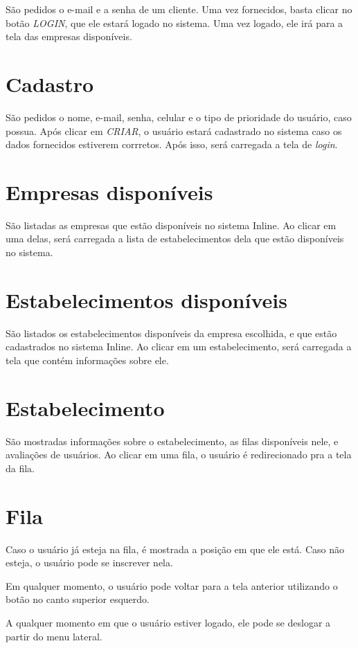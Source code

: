 \documentclass{book}
\begin{document}
São pedidos o e-mail e a senha de um cliente. Uma vez fornecidos, basta clicar
no botão \textit{LOGIN}, que ele estará logado no sistema. Uma vez logado, ele
irá para a tela das empresas disponíveis.

\section{Cadastro}
São pedidos o nome, e-mail, senha, celular e o tipo de prioridade do usuário,
caso possua. Após clicar em \textit{CRIAR}, o usuário estará cadastrado no
sistema caso os dados fornecidos estiverem corrretos. Após isso, será carregada
a tela de \textit{login}.

\section{Empresas disponíveis}
São listadas as empresas que estão disponíveis no sistema Inline. Ao clicar em
uma delas, será carregada a lista de estabelecimentos dela que estão disponíveis
no sistema.

\section{Estabelecimentos disponíveis}
São listados os estabelecimentos disponíveis da empresa escolhida, e que estão
cadastrados no sistema Inline. Ao clicar em um estabelecimento, será carregada a
tela que contém informações sobre ele.

\section{Estabelecimento}
São mostradas informações sobre o estabelecimento, as filas disponíveis nele, e
avaliações de usuários. Ao clicar em uma fila, o usuário é redirecionado pra a
tela da fila.

\section{Fila}
Caso o usuário já esteja na fila, é mostrada a posição em que ele está. Caso não
esteja, o usuário pode se inscrever nela.

Em qualquer momento, o usuário pode voltar para a tela anterior utilizando o
botão no canto superior esquerdo.

A qualquer momento em que o usuário estiver logado, ele pode se deslogar a
partir do menu lateral.
\end{document}
